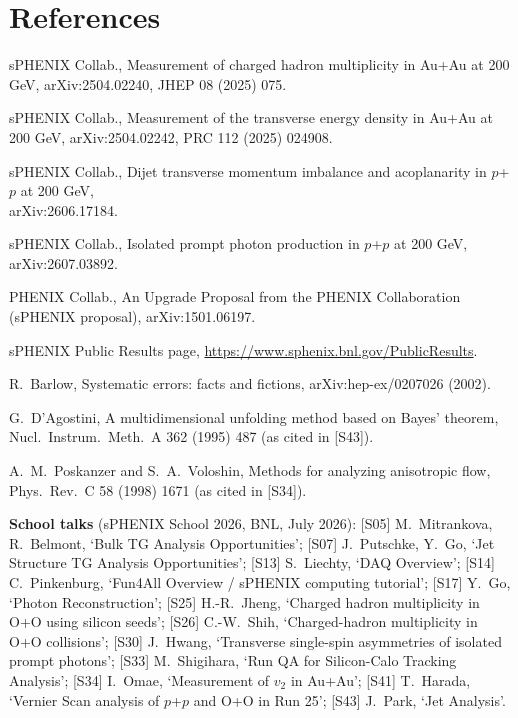 \documentclass[11pt,letterpaper]{article}
\begin{document}
\section{References}
\begin{enumerate}[label={[\arabic*]},itemsep=0pt]
\item sPHENIX Collab., Measurement of charged hadron multiplicity in Au+Au at 200 GeV, arXiv:2504.02240, JHEP 08 (2025) 075.
\item sPHENIX Collab., Measurement of the transverse energy density in Au+Au at 200 GeV, arXiv:2504.02242, PRC 112 (2025) 024908.
\item sPHENIX Collab., Dijet transverse momentum imbalance and acoplanarity in $p$+$p$ at 200 GeV,\\ arXiv:2606.17184.
\item sPHENIX Collab., Isolated prompt photon production in $p$+$p$ at 200 GeV, arXiv:2607.03892.
\item PHENIX Collab., An Upgrade Proposal from the PHENIX Collaboration (sPHENIX proposal), arXiv:1501.06197.
\item sPHENIX Public Results page, \url{https://www.sphenix.bnl.gov/PublicResults}.
\item R.\ Barlow, Systematic errors: facts and fictions, arXiv:hep-ex/0207026 (2002).
\item G.\ D'Agostini, A multidimensional unfolding method based on Bayes' theorem, Nucl.\ Instrum.\ Meth.\ A 362 (1995) 487 (as
cited in [S43]).
\item A.\ M.\ Poskanzer and S.\ A.\ Voloshin, Methods for analyzing anisotropic flow, Phys.\ Rev.\ C 58 (1998) 1671 (as cited in
[S34]).
\end{enumerate}
\textbf{School talks} (sPHENIX School 2026, BNL, July 2026):
{[S05]} M.\ Mitrankova, R.\ Belmont, `Bulk TG Analysis Opportunities';
{[S07]} J.\ Putschke, Y.\ Go, `Jet Structure TG Analysis Opportunities';
{[S13]} S.\ Liechty, `DAQ Overview';
{[S14]} C.\ Pinkenburg, `Fun4All Overview / sPHENIX computing tutorial';
{[S17]} Y.\ Go, `Photon Reconstruction';
{[S25]} H.-R.\ Jheng, `Charged hadron multiplicity in O+O using silicon seeds';
{[S26]} C.-W.\ Shih, `Charged-hadron multiplicity in O+O collisions';
{[S30]} J.\ Hwang, `Transverse single-spin asymmetries of isolated prompt photons';
{[S33]} M.\ Shigihara, `Run QA for Silicon-Calo Tracking Analysis';
{[S34]} I.\ Omae, `Measurement of $v_2$ in Au+Au';
{[S41]} T.\ Harada, `Vernier Scan analysis of $p$+$p$ and O+O in Run 25';
{[S43]} J.\ Park, `Jet Analysis'.
\end{document}
